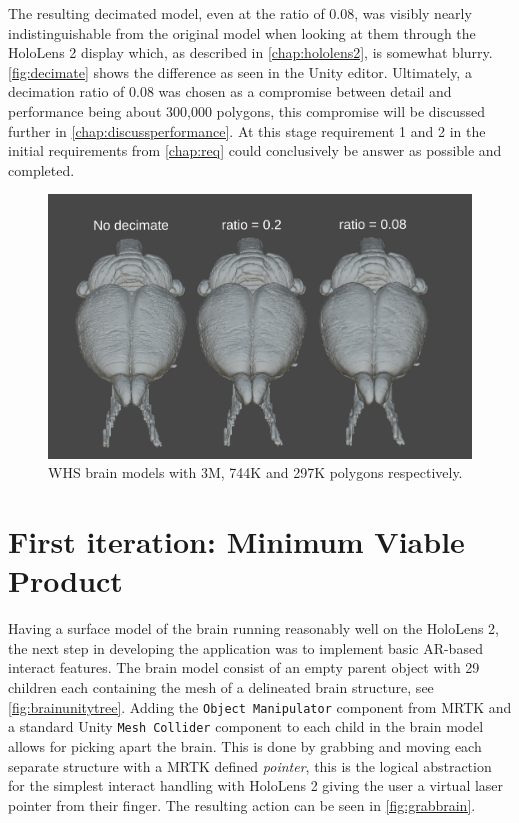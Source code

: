 The resulting decimated model, even at the ratio of 0.08, was visibly nearly indistinguishable from the original model when looking at them through the HoloLens 2 display which, as described in \autoref{chap:hololens2}, is somewhat blurry. \autoref{fig:decimate} shows the difference as seen in the Unity editor. Ultimately, a decimation ratio of 0.08 was chosen as a compromise between detail and performance being about 300,000 polygons, this compromise will be discussed further in \autoref{chap:discussperformance}. At this stage requirement 1 and 2 in the initial requirements from \autoref{chap:req} could conclusively be answer as possible and completed.
\begin{figure}[ht]
    \includegraphics[width={\textwidth},trim={2.5cm 2cm 4.5cm 2cm},clip]{fig/brainmodeldecimateratio2.png}
    \caption{WHS brain models with 3M, 744K and 297K polygons respectively.}
    \label{fig:decimate}
\end{figure}



\section[Iteration 1]{First iteration: Minimum Viable Product}\label{chap:itr1}

Having a surface model of the brain running reasonably well on the HoloLens 2, the next step in developing the application was to implement basic AR-based interact features. The brain model consist of an empty parent object with 29 children each containing the mesh of a delineated brain structure, see \autoref{fig:brainunitytree}. Adding the \texttt{Object Manipulator} component from MRTK and a standard Unity \texttt{Mesh Collider} component to each child in the brain model allows for picking apart the brain. This is done by grabbing and moving each separate structure with a MRTK defined \textit{pointer}, this is the logical abstraction for the simplest interact handling with HoloLens 2 giving the user a virtual laser pointer from their finger. The resulting action can be seen in \autoref{fig:grabbrain}. 

